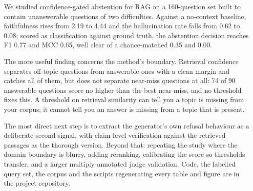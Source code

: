 \documentclass[conference]{IEEEtran}
\begin{document}
We studied confidence-gated abstention for RAG on a 160-question set built to contain unanswerable questions of two difficulties. Against a no-context baseline, faithfulness rises from 2.19 to 4.44 and the hallucination rate falls from 0.62 to 0.08; scored as classification against ground truth, the abstention decision reaches F1 0.77 and MCC 0.65, well clear of a chance-matched 0.35 and 0.00.

The more useful finding concerns the method's boundary. Retrieval confidence separates off-topic questions from answerable ones with a clean margin and catches all of them, but does not separate near-miss questions at all: 74 of 90 answerable questions score no higher than the best near-miss, and no threshold fixes this. A threshold on retrieval similarity can tell you a topic is missing from your corpus; it cannot tell you an answer is missing from a topic that is present.

The most direct next step is to extract the generator's own refusal behaviour as a deliberate second signal, with claim-level verification against the retrieved passages as the thorough version. Beyond that: repeating the study where the domain boundary is blurry, adding reranking, calibrating the score so thresholds transfer, and a larger multiply-annotated judge validation. Code, the labelled query set, the corpus and the scripts regenerating every table and figure are in the project repository.
\end{document}
